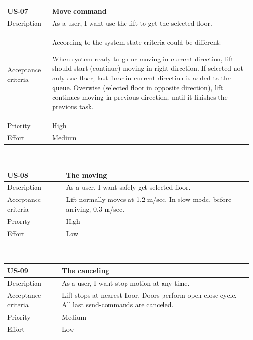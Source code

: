 \documentclass[a4paper,11pt]{article}
\begin{document}
\noindent\begin{tabularx}{\textwidth}{|C{2cm}|Y|}
  \hline
  \textbf{US-07} & \textbf{Move command}\\
  \hline
  Description &
  As a user, I want use the lift to get the selected floor.
  \\
  \hline
  Acceptance criteria &
  According to the system state criteria could be different:

  When system ready to go or moving in current direction, lift should start (continue) moving in right direction. If selected not only one floor, last floor in current direction is added to the queue. Overwise (selected floor in opposite direction), lift continues moving in previous direction, until it finishes the previous task.
  \\
  \hline
  Priority & High\\
  \hline
  Effort & Medium\\
  \hline
\end{tabularx}\\[15pt]

\noindent\begin{tabularx}{\textwidth}{|C{2cm}|Y|}
  \hline
  \textbf{US-08} & \textbf{The moving}\\
  \hline
  Description &
  As a user, I want safely get selected floor.
  \\
  \hline
  Acceptance criteria &
  Lift normally moves at 1.2 m/sec. In slow mode, before arriving, 0.3 m/sec.
  \\
  \hline
  Priority & High\\
  \hline
  Effort & Low\\
  \hline
\end{tabularx}\\[15pt]

\noindent\begin{tabularx}{\textwidth}{|C{2cm}|Y|}
  \hline
  \textbf{US-09} & \textbf{The canceling}\\
  \hline
  Description &
  As a user, I want stop motion at any time.
  \\
  \hline
  Acceptance criteria &
  Lift stops at nearest floor. Doors perform open-close cycle. All last send-commands are canceled.
  \\
  \hline
  Priority & Medium\\
  \hline
  Effort & Low\\
  \hline
\end{tabularx}\\[15pt]
\end{document}
